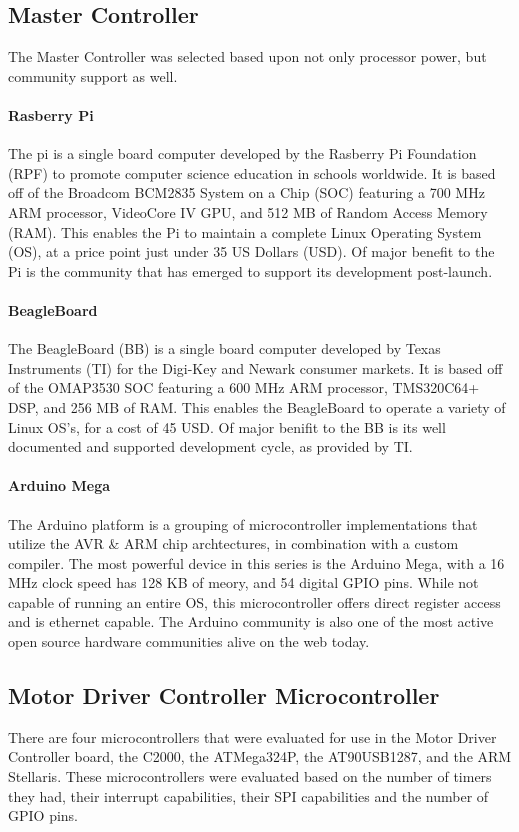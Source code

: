 \subsection{Master Controller}
The Master Controller  was selected based upon not only processor power, but community support as well. 

\paragraph{Rasberry Pi}
The \gls{pi} is a single board computer developed by the Rasberry Pi Foundation (RPF) to promote computer science education in schools worldwide.
It is based off of the Broadcom BCM2835 System on a Chip (SOC) featuring a 700 MHz ARM processor, VideoCore IV GPU, and 512 MB of Random Access Memory (RAM).
This enables the Pi to maintain a complete Linux Operating System (OS), at a price point just under 35 US Dollars (USD).
Of major benefit to the Pi is the community that has emerged to support its development post-launch.

\paragraph{BeagleBoard}
The BeagleBoard (BB) is a single board computer developed by Texas Instruments (TI) for the Digi-Key and Newark consumer markets.
It is based off of the OMAP3530 SOC featuring a 600 MHz ARM processor, TMS320C64+ DSP, and 256 MB of RAM.
This enables the BeagleBoard to operate a variety of Linux OS’s, for a cost of 45 USD.
Of major beniﬁt to the BB is its well documented and supported development cycle, as provided by TI.

\paragraph{Arduino Mega}
The Arduino platform is a grouping of microcontroller implementations that utilize the AVR \& ARM chip archtectures, in combination with a custom compiler.
The most powerful device in this series is the Arduino Mega, with a 16 MHz clock speed has 128 KB of meory, and 54 digital GPIO pins.
While not capable of running an entire OS, this microcontroller offers direct register access and is ethernet capable.
The Arduino community is also one of the most active open source hardware communities alive on the web today.

\subsection{Motor Driver Controller Microcontroller}
There are four microcontrollers that were evaluated for use in the Motor Driver Controller board, the C2000, the ATMega324P, the AT90USB1287, and the ARM Stellaris.
These microcontrollers were evaluated based on the number of timers they had, their interrupt capabilities, their SPI capabilities and the number of GPIO pins.

